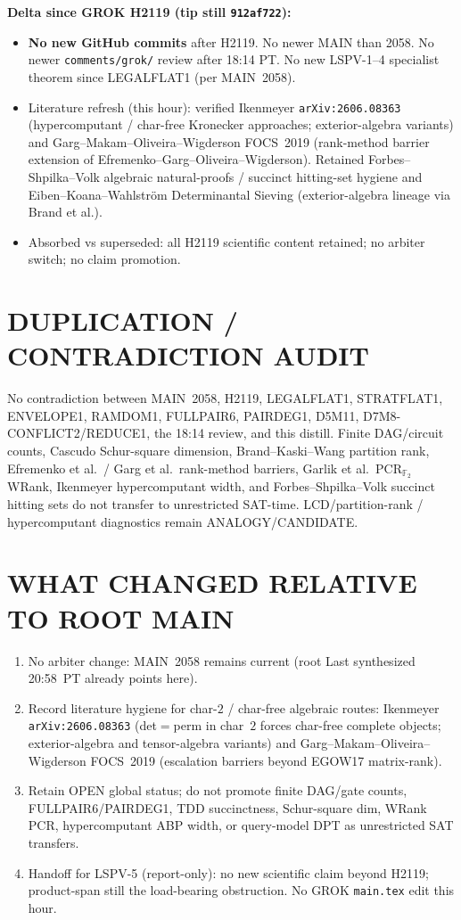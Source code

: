 \documentclass[11pt]{article}
\begin{document}
\textbf{Delta since GROK H2119 (tip still \texttt{912af722}):}
\begin{itemize}
\item \textbf{No new GitHub commits} after H2119. No newer MAIN than 2058.
No newer \texttt{comments/grok/} review after 18:14 PT. No new LSPV-1--4
specialist theorem since LEGALFLAT1 (per MAIN~2058).
\item Literature refresh (this hour): verified Ikenmeyer
\texttt{arXiv:2606.08363} (hypercomputant / char-free Kronecker approaches;
exterior-algebra variants) and Garg--Makam--Oliveira--Wigderson FOCS~2019
(rank-method barrier extension of Efremenko--Garg--Oliveira--Wigderson).
Retained Forbes--Shpilka--Volk algebraic natural-proofs / succinct hitting-set
hygiene and Eiben--Koana--Wahlstr\"om Determinantal Sieving (exterior-algebra
lineage via Brand et al.).
\item Absorbed vs superseded: all H2119 scientific content retained; no
arbiter switch; no claim promotion.
\end{itemize}

\section*{DUPLICATION / CONTRADICTION AUDIT}
No contradiction between MAIN~2058, H2119, LEGALFLAT1, STRATFLAT1, ENVELOPE1,
RAMDOM1, FULLPAIR6, PAIRDEG1, D5M11, D7M8-CONFLICT2/REDUCE1, the 18:14 review,
and this distill. Finite DAG/circuit counts, Cascudo Schur-square dimension,
Brand--Kaski--Wang partition rank, Efremenko et al.\ / Garg et al.\ rank-method
barriers, Garlik et al.\ PCR$_{\mathbb F_2}$ WRank, Ikenmeyer hypercomputant
width, and Forbes--Shpilka--Volk succinct hitting sets do not transfer to
unrestricted SAT-time. LCD/partition-rank / hypercomputant diagnostics remain
ANALOGY/CANDIDATE.

\section*{WHAT CHANGED RELATIVE TO ROOT MAIN}
\begin{enumerate}
\item No arbiter change: MAIN~2058 remains current (root Last synthesized
20:58~PT already points here).
\item Record literature hygiene for char-$2$ / char-free algebraic routes:
Ikenmeyer \texttt{arXiv:2606.08363} (det$=$perm in char~$2$ forces char-free
complete objects; exterior-algebra and tensor-algebra variants) and
Garg--Makam--Oliveira--Wigderson FOCS~2019 (escalation barriers beyond
EGOW17 matrix-rank).
\item Retain OPEN global status; do not promote finite DAG/gate counts,
FULLPAIR6/PAIRDEG1, TDD succinctness, Schur-square dim, WRank PCR,
hypercomputant ABP width, or query-model DPT as unrestricted SAT transfers.
\item Handoff for LSPV-5 (report-only): no new scientific claim beyond H2119;
product-span still the load-bearing obstruction. No GROK \texttt{main.tex}
edit this hour.
\end{enumerate}
\end{document}
